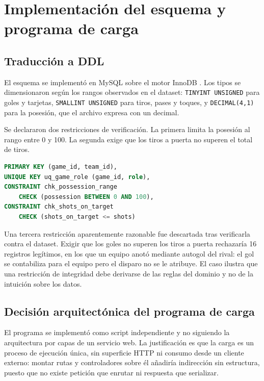 \documentclass[conference]{IEEEtran}
\begin{document}
\section{Implementación del esquema y programa de carga}

\subsection{Traducción a DDL}

El esquema se implementó en MySQL sobre el motor InnoDB \cite{mysql}. Los tipos se
dimensionaron según los rangos observados en el dataset: \texttt{TINYINT
UNSIGNED} para goles y tarjetas, \texttt{SMALLINT UNSIGNED} para tiros, pases y
toques, y \texttt{DECIMAL(4,1)} para la posesión, que el archivo expresa con un
decimal.

Se declararon dos restricciones de verificación. La primera limita la posesión
al rango entre 0 y 100. La segunda exige que los tiros a puerta no superen el
total de tiros.

\begin{lstlisting}[language=SQL,caption={Restricciones de la tabla puente}]
PRIMARY KEY (game_id, team_id),
UNIQUE KEY uq_game_role (game_id, role),
CONSTRAINT chk_possession_range
    CHECK (possession BETWEEN 0 AND 100),
CONSTRAINT chk_shots_on_target
    CHECK (shots_on_target <= shots)
\end{lstlisting}

Una tercera restricción aparentemente razonable fue descartada tras verificarla
contra el dataset. Exigir que los goles no superen los tiros a puerta
rechazaría 16 registros legítimos, en los que un equipo anotó mediante autogol
del rival: el gol se contabiliza para el equipo pero el disparo no se le
atribuye. El caso ilustra que una restricción de integridad debe derivarse de
las reglas del dominio y no de la intuición sobre los datos.

\subsection{Decisión arquitectónica del programa de carga}

El programa se implementó como script independiente y no siguiendo la
arquitectura por capas de un servicio web. La justificación es que la carga es
un proceso de ejecución única, sin superficie HTTP ni consumo desde un cliente
externo: montar rutas y controladores sobre él añadiría indirección sin
estructura, puesto que no existe petición que enrutar ni respuesta que
serializar.
\end{document}
